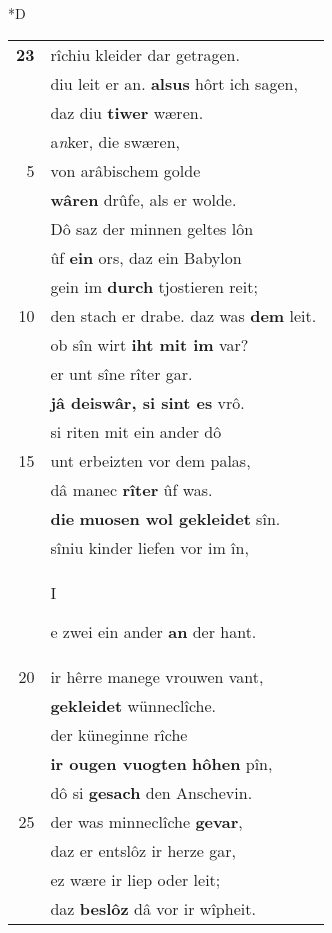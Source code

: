 \documentclass[8pt,a4paper,notitlepage]{article}
\begin{document}
\begin{table}[ht]
\begin{minipage}[t]{0.5\linewidth}
\small
\begin{center}*D
\end{center}
\begin{tabular}{rl}
\textbf{23} & rîchiu kleider dar getragen.\\ 
 & diu leit er an. \textbf{alsus} hôrt ich sagen,\\ 
 & daz diu \textbf{tiwer} wæren.\\ 
 & a\textit{n}ker, die swæren,\\ 
5 & von arâbischem golde\\ 
 & \textbf{wâren} drûfe, als er wolde.\\ 
 & Dô saz der minnen geltes lôn\\ 
 & ûf \textbf{ein} ors, daz ein Babylon\\ 
 & gein im \textbf{durch} tjostieren reit;\\ 
10 & den stach er drabe. daz was \textbf{dem} leit.\\ 
 & ob sîn wirt \textbf{iht mit im} var?\\ 
 & er unt sîne rîter gar.\\ 
 & \textbf{jâ deiswâr, si sint es} vrô.\\ 
 & si riten mit ein ander dô\\ 
15 & unt erbeizten vor dem palas,\\ 
 & dâ manec \textbf{rîter} ûf was.\\ 
 & \textbf{die} \textbf{muosen wol gekleidet} sîn.\\ 
 & sîniu kinder liefen vor im în,\\ 
 & \begin{large}I\end{large}e zwei ein ander \textbf{an} der hant.\\ 
20 & ir hêrre manege vrouwen vant,\\ 
 & \textbf{gekleidet} wünneclîche.\\ 
 & der küneginne rîche\\ 
 & \textbf{ir ougen vuogten} \textbf{hôhen} pîn,\\ 
 & dô si \textbf{gesach} den Anschevin.\\ 
25 & der was minneclîche \textbf{gevar},\\ 
 & daz er entslôz ir herze gar,\\ 
 & ez wære ir liep oder leit;\\ 
 & daz \textbf{beslôz} dâ vor ir wîpheit.\\ 

\end{tabular}
\end{minipage}
\end{table}
\end{document}
